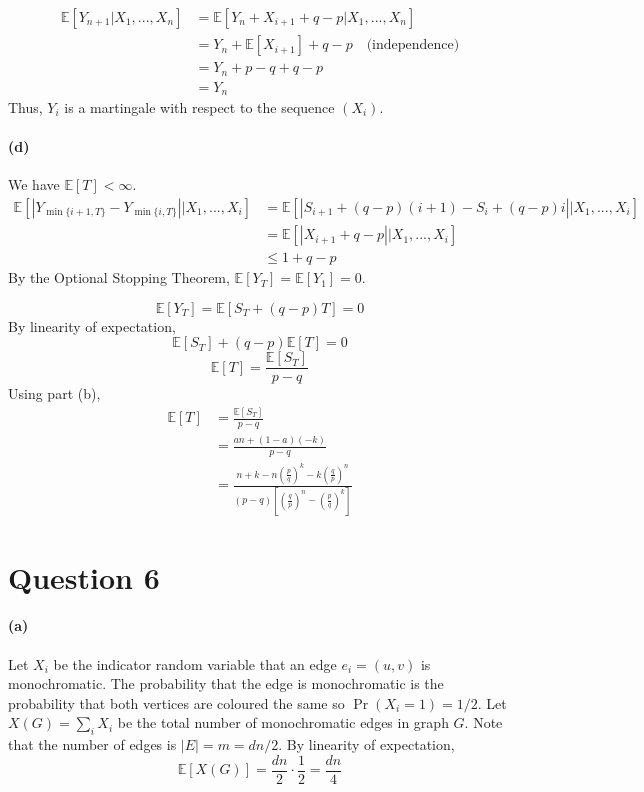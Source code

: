\documentclass[11pt]{article} %
\begin{document}
\begin{equation}
\begin{aligned}
\mathbb{E}[Y_{n+1}| X_1,...,X_n] &= \mathbb{E}[Y_n + X_{i+1} +q-p| X_1,...,X_n]\\
&= Y_n + \mathbb{E}[X_{i+1}] + q-p \quad\text{(independence)}\\
&= Y_n + p-q + q-p\\
&= Y_n
\end{aligned}
\end{equation}
Thus, $Y_i$ is a martingale with respect to the sequence $(X_i)$.

\clearpage
\paragraph{(d)}
We have $\mathbb{E}[T] < \infty$.
\begin{equation}
\begin{aligned}
\mathbb{E}[|Y_{\min\{i+1,T\}} - Y_{\min\{i,T\}}||X_1,...,X_i]
&= \mathbb{E}[|S_{i+1} + (q-p)(i+1)- S_i + (q-p)i||X_1,...,X_i]\\
&= \mathbb{E}[|X_{i+1} + q-p||X_1,...,X_i]\\
&\leq 1+q-p
\end{aligned}
\end{equation}
By the Optional Stopping Theorem, $\mathbb{E}[Y_T]=\mathbb{E}[Y_1] = 0$.

\[\mathbb{E}[Y_T]=\mathbb{E}[S_T+(q-p)T]=0\]
By linearity of expectation,
\[\mathbb{E}[S_T]+(q-p)\mathbb{E}[T]=0\]
\[\mathbb{E}[T]=\frac{\mathbb{E}[S_T]}{p-q}\]
Using part (b),
\begin{equation}
\begin{aligned}
\mathbb{E}[T]&=\frac{\mathbb{E}[S_T]}{p-q}\\
&=\frac{an+(1-a)(-k)}{p-q}\\
&=\frac{n+k-n\left(\frac{p}{q}\right)^k - k\left(\frac{q}{p}\right)^n}
{(p-q)\left[\left(\frac{q}{p}\right)^n-\left(\frac{p}{q}\right)^k\right]}
\end{aligned}
\end{equation}

\clearpage
\section*{Question 6}
\paragraph{(a)}
Let $X_i$ be the indicator random variable that an edge $e_i=(u,v)$ is monochromatic.
The probability that the edge is monochromatic is the probability that
both vertices are coloured the same so $\Pr(X_i=1)=1/2$.
Let $X(G)=\sum_i X_i$ be the total number of monochromatic edges in graph $G$.
Note that the number of edges is $|E|=m=dn/2$.
By linearity of expectation,
\[\mathbb{E}[X(G)]=\frac{dn}{2}\cdot\frac{1}{2}=\frac{dn}{4}\]
\end{document}
